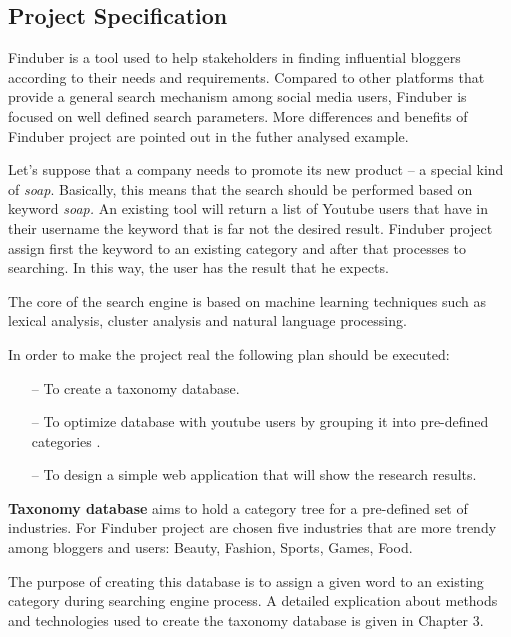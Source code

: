 \subsection{Project Specification}

Finduber is a tool used to help stakeholders in finding influential bloggers according to their needs and requirements. Compared to other platforms that provide a general search mechanism among social media users, Finduber is focused on well defined search parameters. More differences and benefits of Finduber project are pointed out in the futher analysed example. 

Let's suppose that a company needs to promote its new product -- a special kind of \textit{soap}. Basically, this means that the search should be performed based on keyword \textit{soap.} An existing tool will return a list of Youtube users that have in their username the keyword that is far not the desired result. Finduber project assign first the keyword to an existing category and after that processes to searching. In this way, the user has the result that he expects.

The core of the search engine is based on machine learning techniques such as lexical analysis, cluster analysis and natural language processing.

In order to make the project real the following plan should be executed:

\begin{enumerate}

\item[--] To create a taxonomy database. 

\item[--] To optimize database with youtube users by grouping it into pre-defined categories .

\item[--] To design a simple web application that will show the research results. 

\end{enumerate}

\textbf{Taxonomy database} aims to hold a category tree for a pre-defined set of industries. For Finduber project are chosen five industries that are more trendy among bloggers and users: Beauty, Fashion, Sports, Games, Food. 

The purpose of creating this database is to assign a given word to an existing category during searching engine process. A detailed explication about methods and technologies used to create the taxonomy database is given in Chapter 3. 

